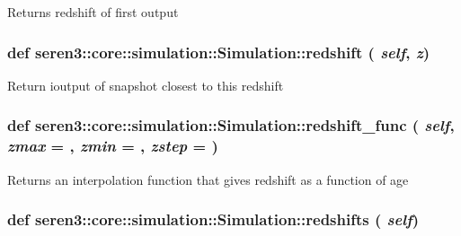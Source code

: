 \label{classseren3_1_1core_1_1simulation_1_1Simulation_addf704f464ffb0289cd5bce16d91da5d}
\begin{DoxyVerb}
Returns redshift of first output
\end{DoxyVerb}
 \hypertarget{classseren3_1_1core_1_1simulation_1_1Simulation_a313d43319ac94b60394ef4117bb145ef}{
\subsubsection[{redshift}]{\setlength{\rightskip}{0pt plus 5cm}def seren3::core::simulation::Simulation::redshift ( {\em self}, \/   {\em z})}}
\label{classseren3_1_1core_1_1simulation_1_1Simulation_a313d43319ac94b60394ef4117bb145ef}
\begin{DoxyVerb}
Return ioutput of snapshot closest to this redshift
\end{DoxyVerb}
 \hypertarget{classseren3_1_1core_1_1simulation_1_1Simulation_aa1967578ed11d694618646cce346dd6a}{
\subsubsection[{redshift\_\-func}]{\setlength{\rightskip}{0pt plus 5cm}def seren3::core::simulation::Simulation::redshift\_\-func ( {\em self}, \/   {\em zmax} = {}, \/   {\em zmin} = {}, \/   {\em zstep} = {})}}
\label{classseren3_1_1core_1_1simulation_1_1Simulation_aa1967578ed11d694618646cce346dd6a}
\begin{DoxyVerb}
Returns an interpolation function that gives redshift as a function
of age
\end{DoxyVerb}
 \hypertarget{classseren3_1_1core_1_1simulation_1_1Simulation_adb741a615add9f0ad27ae17f8056dbdb}{
\subsubsection[{redshifts}]{\setlength{\rightskip}{0pt plus 5cm}def seren3::core::simulation::Simulation::redshifts ( {\em self})}}
